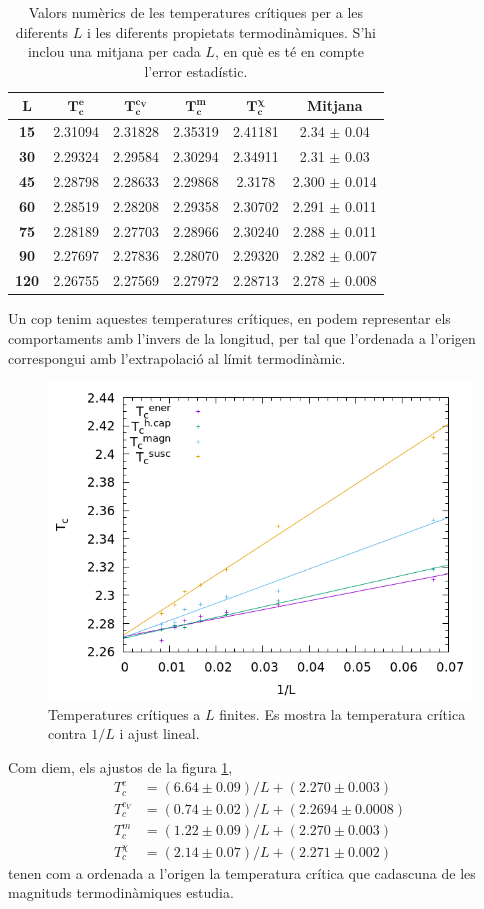\documentclass[a4paper]{article}
\begin{document}
\begin{table}[H]
\centering
\begin{tabular}{cccccc}
\hline
$\mathbf{L}$ & $\mathbf{T_c^e}$ & $\mathbf{T_c^{c_V}}$ & $\mathbf{T_c^m}$ & $\mathbf{T_c^\chi}$ & \textbf{Mitjana} \\ \hline
\textbf{15} & 2.31094 & 2.31828 & 2.35319 & 2.41181 & 2.34 $\pm$ 0.04 \\
\textbf{30} & 2.29324 & 2.29584 & 2.30294 & 2.34911 & 2.31 $\pm$ 0.03 \\
\textbf{45} & 2.28798 & 2.28633 & 2.29868 & 2.3178 & 2.300 $\pm$ 0.014 \\
\textbf{60} & 2.28519 & 2.28208 & 2.29358 & 2.30702 & 2.291 $\pm$ 0.011 \\
\textbf{75} & 2.28189 & 2.27703 & 2.28966 & 2.30240 & 2.288 $\pm$ 0.011 \\
\textbf{90} & 2.27697 & 2.27836 & 2.28070 & 2.29320 & 2.282 $\pm$ 0.007 \\
\textbf{120} & 2.26755 & 2.27569 & 2.27972 & 2.28713 & 2.278 $\pm$ 0.008
\end{tabular}
\caption{Valors numèrics de les temperatures crítiques per a les diferents $L$ i les diferents propietats termodinàmiques. S'hi inclou una mitjana per cada $L$, en què es té en compte l'error estadístic.}
\label{tab:tcs}
\end{table}

Un cop tenim aquestes temperatures crítiques, en podem representar els comportaments amb l'invers de la longitud, per tal que l'ordenada a l'origen correspongui amb l'extrapolació al límit termodinàmic.
\begin{figure}[H]
    \centering
    \includegraphics[width=.6\textwidth]{coefs-tc.png}
    \caption{Temperatures crítiques a $L$ finites. Es mostra la temperatura crítica contra $1/L$ i ajust lineal.}
    \label{fig:tc}
\end{figure}

Com diem, els ajustos de la figura \ref{fig:tc},
\begin{align*}
    T_c^{e} &= (6.64 \pm 0.09)/L + (2.270 \pm 0.003) \\
    T_c^{c_V} &= (0.74 \pm 0.02)/L + (2.2694 \pm 0.0008) \\
    T_c^{m} &= (1.22 \pm 0.09)/L + (2.270 \pm 0.003) \\
    T_c^{\chi} &= (2.14 \pm 0.07)/L + (2.271 \pm 0.002)
\end{align*}
tenen com a ordenada a l'origen la temperatura crítica que cadascuna de les magnituds termodinàmiques estudia.
\end{document}
